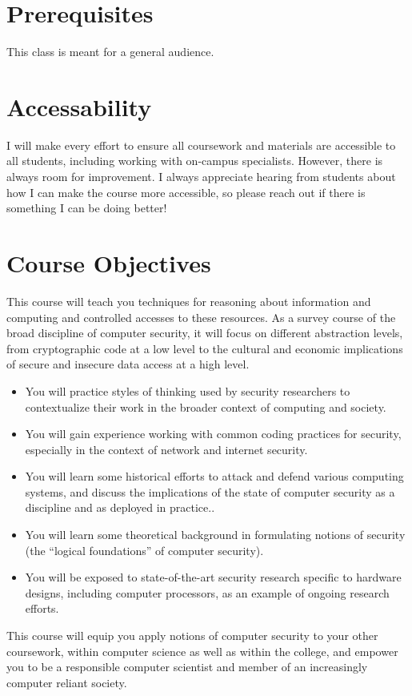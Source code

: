 \documentclass[11pt]{article}
\begin{document}
\section*{Prerequisites}

This class is meant for a general audience.

\section*{Accessability}

I will make every effort to ensure all coursework and materials are accessible to all students, including working with on-campus specialists. However, there is always room for improvement. I always appreciate hearing from students about how I can make the course more accessible, so please reach out if there is something I can be doing better!


\section*{Course Objectives}
This course will teach you techniques for reasoning about information and computing and controlled accesses to these resources. As a survey course of the broad discipline of computer security, it will focus on different abstraction levels, from cryptographic code at a low level to the cultural and economic implications of secure and insecure data access at a high level.
\begin{itemize}
\item You will practice styles of thinking used by security researchers to contextualize their work in the broader context of computing and society.
\item You will gain experience working with common coding practices for security, especially in the context of network and internet security.
\item You will learn some historical efforts to attack and defend various computing systems, and discuss the implications of the state of computer security as a discipline and as deployed in practice..
\item You will learn some theoretical background in formulating notions of security (the ``logical foundations'' of computer security).
\item You will be exposed to state-of-the-art security research specific to hardware designs, including computer processors, as an example of ongoing research efforts.
\end{itemize}
This course will equip you apply notions of computer security to your other coursework, within computer science as well as within the college, and empower you to be a responsible computer scientist and member of an increasingly computer reliant society.
\end{document}
